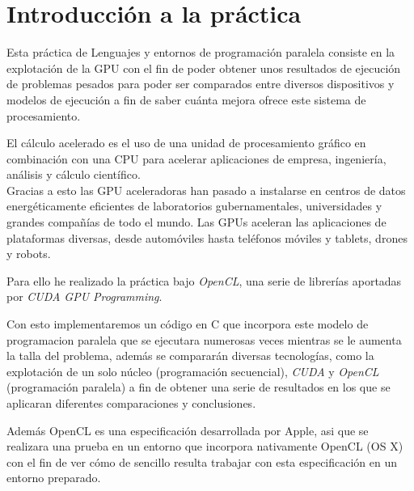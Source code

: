 
\chapter{Introducción a la práctica}

Esta práctica de Lenguajes y entornos de programación paralela consiste en la explotación de la GPU con el fin de poder obtener unos resultados de ejecución de problemas pesados para poder ser comparados entre diversos dispositivos y modelos de ejecución a fin de saber cuánta mejora ofrece este sistema de procesamiento.

El cálculo acelerado es el uso de una unidad de procesamiento gráfico en combinación con una CPU para acelerar aplicaciones de empresa, ingeniería, análisis y cálculo científico.\\
Gracias a esto las GPU aceleradoras han pasado a instalarse en centros de datos energéticamente eficientes de laboratorios gubernamentales, universidades y grandes compañías de todo el mundo. Las GPUs aceleran las aplicaciones de plataformas diversas, desde automóviles hasta teléfonos móviles y tablets, drones y robots.

Para ello he realizado la práctica bajo \textit{OpenCL}, una serie de librerías aportadas por \textit{CUDA GPU Programming}.

Con esto implementaremos un código en C que incorpora este modelo de programacion paralela que se ejecutara numerosas veces mientras se le aumenta la talla del problema, además se compararán diversas tecnologías, como la explotación de un solo núcleo (programación secuencial), \textit{CUDA} y \textit{OpenCL} (programación paralela) a fin de obtener una serie de resultados en los que se aplicaran diferentes comparaciones y conclusiones.

Además OpenCL es una especificación desarrollada por Apple, asi que se realizara una prueba en un entorno que incorpora nativamente OpenCL (OS X) con el fin de ver cómo de sencillo resulta trabajar con esta especificación en un entorno preparado.
